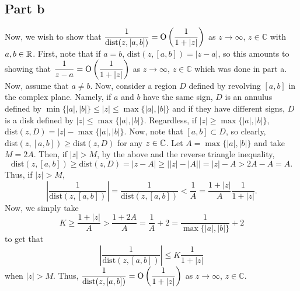 \documentclass{article}
\begin{document}
\subsection{Part b}
Now, we wish to show that $\displaystyle \frac{1}{\mathrm{dist}(z,[a,b])} = \operatorname{O}\left(\frac{1}{1 + |z|} \right)$ as $z \to \infty$, $z \in \mathbb C$ with $a,b\in\mathbb{R}$. First, note that if $a=b$, $\mathrm{dist}(z,[a,b])=|z-a|$, so this amounts to showing that $\displaystyle \frac{1}{z -a} = \operatorname{O}\left(\frac{1}{1 + |z|} \right)$ as $z \to \infty$, $z \in \mathbb C$ which was done in part a. Now, assume that $a\neq b$. Now, consider a region $D$ defined by revolving $[a,b]$ in the complex plane. Namely, if $a$ and $b$ have the same sign, $D$ is an annulus defined by $\min\{|a|,|b|\}\leq |z|\leq\max\{|a|,|b|\}$ and if they have different signs, $D$ is a disk defined by $|z|\leq\max\{|a|,|b|\}$. Regardless, if $|z|\geq\max\{|a|,|b|\}$, $\mathrm{dist}(z,D)=|z|-\max\{|a|,|b|\}$. Now, note that $[a,b]\subset D$, so clearly, $\mathrm{dist}(z,[a,b])\geq\mathrm{dist}(z,D)$ for any $z\in \mathbb{C}$. Let $A=\max\{|a|,|b|\}$ and take $M=2A$. Then, if $|z|>M$, by the above and the reverse triangle inequality, 
\[
\mathrm{dist}(z,[a,b])\geq\mathrm{dist}(z,D)=|z-A|\geq\left||z|-|A|\right|=|z|-A>2A-A=A.
\]
Thus, if $|z|>M$,
\[
\left|\frac{1}{\mathrm{dist}(z,[a,b])}\right|=\frac{1}{\mathrm{dist}(z,[a,b])}<\frac{1}{A}=\frac{1+|z|}{A}\frac{1}{1+|z|}.
\]
Now, we simply take
\[
K\geq\frac{1+|z|}{A}>\frac{1+2A}{A}=\frac{1}{A}+2=\frac{1}{\max\{|a|,|b|\}}+2
\]
to get that 
\[
\left|\frac{1}{\mathrm{dist}(z,[a,b])}\right|\leq K\frac{1}{1+|z|}
\]
when $|z|>M$. Thus, $\displaystyle \frac{1}{\mathrm{dist}(z,[a,b])} = \operatorname{O}\left(\frac{1}{1 + |z|} \right)$ as $z \to \infty$, $z \in \mathbb C$.
\end{document}
